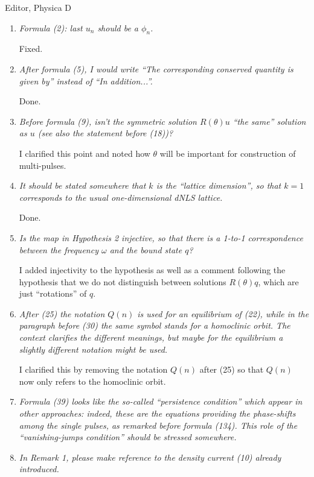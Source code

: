 \documentclass[11pt]{letter}
\begin{document}
\begin{letter}{Editor, Physica D}
\begin{enumerate}
\item \emph{Formula (2): last $u_n$ should be a $\phi_n$.}

Fixed.

\item \emph{After formula (5), I would write ``The corresponding conserved quantity is given by''
instead of ``In addition...''.}

Done.

\item \emph{Before formula (9), isn’t the symmetric solution $R(\theta)u$ ``the same'' solution as $u$ (see also the statement before (18))?}

I clarified this point and noted how $\theta$ will be important for construction of multi-pulses.

\item \emph{It should be stated somewhere that $k$ is the ``lattice dimension'', so that $k = 1$ corresponds to the usual one-dimensional dNLS lattice. }

Done.

\item \emph{Is the map in Hypothesis 2 injective, so that there is a 1-to-1 correspondence between the frequency $\omega$ and the bound state $q$?}

I added injectivity to the hypothesis as well as a comment following the hypothesis that we do not distinguish between solutions $R(\theta)q$, which are just ``rotations'' of $q$.

\item \emph{After (25) the notation $Q(n)$ is used for an equilibrium of (22), while in the paragraph before (30) the same symbol stands for a homoclinic orbit. The context clarifies the different meanings, but maybe for the equilibrium a slightly different notation might be used.}

I clarified this by removing the notation $Q(n)$ after (25) so that $Q(n)$ now only refers to the homoclinic orbit.

\item \emph{Formula (39) looks like the so-called ``persistence condition'' which appear in other approaches: indeed, these are the equations providing the phase-shifts among the single pulses, as remarked before formula (134). This role of the ``vanishing-jumps condition'' should be stressed somewhere.}

\item \emph{In Remark 1, please make reference to the density current (10) already introduced.}


\end{enumerate}
\end{letter}
\end{document}
